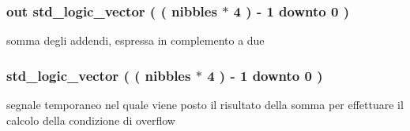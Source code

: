 \hypertarget{group___carry_loockahead_ga1b4798a9e96bb32e9c08ce68e24e7871}{
\subsubsection[{sum}]{ {\bfseries \textcolor{vhdlchar}{out}\textcolor{vhdlchar}{ }} {\bfseries \textcolor{vhdlchar}{std\+\_\+logic\+\_\+vector}\textcolor{vhdlchar}{ }\textcolor{vhdlchar}{(}\textcolor{vhdlchar}{ }\textcolor{vhdlchar}{(}\textcolor{vhdlchar}{ }\textcolor{vhdlchar}{ }\textcolor{vhdlchar}{ }\textcolor{vhdlchar}{ }{\bfseries {\bf nibbles}} \textcolor{vhdlchar}{$\ast$}\textcolor{vhdlchar}{ } \textcolor{vhdldigit}{4} \textcolor{vhdlchar}{ }\textcolor{vhdlchar}{)}\textcolor{vhdlchar}{ }\textcolor{vhdlchar}{-\/}\textcolor{vhdlchar}{ } \textcolor{vhdldigit}{1} \textcolor{vhdlchar}{ }\textcolor{vhdlchar}{downto}\textcolor{vhdlchar}{ }\textcolor{vhdlchar}{ } \textcolor{vhdldigit}{0} \textcolor{vhdlchar}{ }\textcolor{vhdlchar}{)}\textcolor{vhdlchar}{ }} \hspace{0.3cm}{\ttfamily [Port]}}}\label{group___carry_loockahead_ga1b4798a9e96bb32e9c08ce68e24e7871}


somma degli addendi, espressa in complemento a due 

\hypertarget{group___carry_loockahead_ga99974841945a5f91b014f0149e173356}{
\subsubsection[{sum\+\_\+tmp}]{ {\bfseries \textcolor{vhdlchar}{std\+\_\+logic\+\_\+vector}\textcolor{vhdlchar}{ }\textcolor{vhdlchar}{(}\textcolor{vhdlchar}{ }\textcolor{vhdlchar}{(}\textcolor{vhdlchar}{ }\textcolor{vhdlchar}{ }\textcolor{vhdlchar}{ }\textcolor{vhdlchar}{ }{\bfseries {\bf nibbles}} \textcolor{vhdlchar}{$\ast$}\textcolor{vhdlchar}{ } \textcolor{vhdldigit}{4} \textcolor{vhdlchar}{ }\textcolor{vhdlchar}{)}\textcolor{vhdlchar}{ }\textcolor{vhdlchar}{-\/}\textcolor{vhdlchar}{ } \textcolor{vhdldigit}{1} \textcolor{vhdlchar}{ }\textcolor{vhdlchar}{downto}\textcolor{vhdlchar}{ }\textcolor{vhdlchar}{ } \textcolor{vhdldigit}{0} \textcolor{vhdlchar}{ }\textcolor{vhdlchar}{)}\textcolor{vhdlchar}{ }} \hspace{0.3cm}{\ttfamily [Signal]}}}\label{group___carry_loockahead_ga99974841945a5f91b014f0149e173356}


segnale temporaneo nel quale viene posto il risultato della somma per effettuare il calcolo della condizione di overflow 

